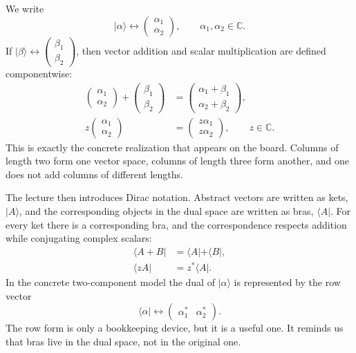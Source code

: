 We write
\begin{equation}
|\alpha\rangle \leftrightarrow
\begin{pmatrix}
\alpha_1\\
\alpha_2
\end{pmatrix},
\qquad
\alpha_1,\alpha_2\in\mathbb{C}.
\end{equation}
If \( |\beta\rangle \leftrightarrow \begin{pmatrix}\beta_1\\ \beta_2\end{pmatrix}\), then vector addition and scalar multiplication are defined componentwise:
\begin{align}
\begin{pmatrix}
\alpha_1\\
\alpha_2
\end{pmatrix}
+
\begin{pmatrix}
\beta_1\\
\beta_2
\end{pmatrix}
&=
\begin{pmatrix}
\alpha_1+\beta_1\\
\alpha_2+\beta_2
\end{pmatrix},\\
z
\begin{pmatrix}
\alpha_1\\
\alpha_2
\end{pmatrix}
&=
\begin{pmatrix}
z\alpha_1\\
z\alpha_2
\end{pmatrix},
\qquad
z\in\mathbb{C}.
\end{align}
This is exactly the concrete realization that appears on the board. Columns of length two form one vector space, columns of length three form another, and one does not add columns of different lengths.

The lecture then introduces Dirac notation. Abstract vectors are written as kets, \( |A\rangle \), and the corresponding objects in the dual space are written as bras, \( \langle A| \). For every ket there is a corresponding bra, and the correspondence respects addition while conjugating complex scalars:
\begin{align}
\langle A+B| &= \langle A|+\langle B|,\\
\langle zA| &= z^* \langle A|.
\end{align}
In the concrete two-component model the dual of
\(
|\alpha\rangle
\)
is represented by the row vector
\begin{equation}
\langle \alpha|
\leftrightarrow
\begin{pmatrix}
\alpha_1^* & \alpha_2^*
\end{pmatrix}.
\end{equation}
The row form is only a bookkeeping device, but it is a useful one. It reminds us that bras live in the dual space, not in the original one.

